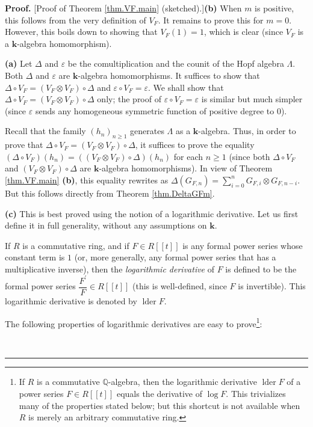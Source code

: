 \documentclass[numbers=enddot,12pt,final,onecolumn,notitlepage]{scrartcl}%
\theoremstyle{definition}
\newenvironment{proof}[1][Proof]{\noindent\textbf{#1.} }{\ \rule{0.5em}{0.5em}}
\let\sumnonlimits\sum
\renewcommand{\sum}{\sumnonlimits\limits}
\newenvironment{vershort}{}{}
\begin{document}
\begin{vershort}
\begin{proof}
[Proof of Theorem \ref{thm.VF.main} (sketched).]\textbf{(b)} When $m$ is
positive, this follows from the very definition of $V_{F}$. It remains to
prove this for $m=0$. However, this boils down to showing that $V_{F}\left(
1\right)  =1$, which is clear (since $V_{F}$ is a $\mathbf{k}$-algebra homomorphism).

\textbf{(a)} Let $\Delta$ and $\varepsilon$ be the comultiplication and the
counit of the Hopf algebra $\Lambda$. Both $\Delta$ and $\varepsilon$ are
$\mathbf{k}$-algebra homomorphisms. It suffices to show that $\Delta\circ
V_{F}=\left(  V_{F}\otimes V_{F}\right)  \circ\Delta$ and $\varepsilon\circ
V_{F}=\varepsilon$. We shall show that $\Delta\circ V_{F}=\left(  V_{F}\otimes
V_{F}\right)  \circ\Delta$ only; the proof of $\varepsilon\circ V_{F}%
=\varepsilon$ is similar but much simpler (since $\varepsilon$ sends any
homogeneous symmetric function of positive degree to $0$).

Recall that the family $\left(  h_{n}\right)  _{n\geq1}$ generates $\Lambda$
as a $\mathbf{k}$-algebra. Thus, in order to prove that $\Delta\circ
V_{F}=\left(  V_{F}\otimes V_{F}\right)  \circ\Delta$, it suffices to prove
the equality $\left(  \Delta\circ V_{F}\right)  \left(  h_{n}\right)  =\left(
\left(  V_{F}\otimes V_{F}\right)  \circ\Delta\right)  \left(  h_{n}\right)  $
for each $n\geq1$ (since both $\Delta\circ V_{F}$ and $\left(  V_{F}\otimes
V_{F}\right)  \circ\Delta$ are $\mathbf{k}$-algebra homomorphisms). In view of
Theorem \ref{thm.VF.main} \textbf{(b)}, this equality rewrites as
$\Delta\left(  G_{F,n}\right)  =\sum_{i=0}^{n}G_{F,i}\otimes G_{F,n-i}$. But
this follows directly from Theorem \ref{thm.DeltaGFm}.

\textbf{(c)} This is best proved using the notion of a logarithmic derivative.
Let us first define it in full generality, without any assumptions on
$\mathbf{k}$.

If $R$ is a commutative ring, and if $F\in R\left[  \left[  t\right]  \right]
$ is any formal power series whose constant term is $1$ (or, more generally,
any formal power series that has a multiplicative inverse), then the
\emph{logarithmic derivative} of $F$ is defined to be the formal power series
$\dfrac{F^{\prime}}{F}\in R\left[  \left[  t\right]  \right]  $ (this is
well-defined, since $F$ is invertible). This logarithmic derivative is denoted
by $\operatorname*{lder}F$.

The following properties of logarithmic derivatives are easy to
prove\footnote{If $R$ is a commutative $\mathbb{Q}$-algebra, then the
logarithmic derivative $\operatorname*{lder}F$ of a power series $F\in
R\left[  \left[  t\right]  \right]  $ equals the derivative of $\log F$. This
trivializes many of the properties stated below; but this shortcut is not
available when $R$ is merely an arbitrary commutative ring.}:


\end{proof}
\end{vershort}
\end{document}
